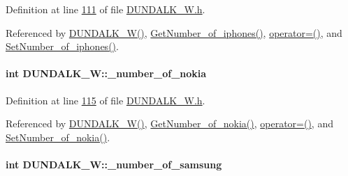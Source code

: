 Definition at line \hyperlink{_d_u_n_d_a_l_k___w_8h_source_l00111}{111} of file \hyperlink{_d_u_n_d_a_l_k___w_8h_source}{D\+U\+N\+D\+A\+L\+K\+\_\+\+W.\+h}.



Referenced by \hyperlink{_d_u_n_d_a_l_k___w_8h_source_l00024}{D\+U\+N\+D\+A\+L\+K\+\_\+\+W()}, \hyperlink{_d_u_n_d_a_l_k___w_8cpp_source_l00113}{Get\+Number\+\_\+of\+\_\+iphones()}, \hyperlink{_d_u_n_d_a_l_k___w_8h_source_l00075}{operator=()}, and \hyperlink{_d_u_n_d_a_l_k___w_8cpp_source_l00109}{Set\+Number\+\_\+of\+\_\+iphones()}.

\paragraph[{\texorpdfstring{\+\_\+number\+\_\+of\+\_\+nokia}{_number_of_nokia}}]{\setlength{\rightskip}{0pt plus 5cm}int D\+U\+N\+D\+A\+L\+K\+\_\+\+W\+::\+\_\+number\+\_\+of\+\_\+nokia\hspace{0.3cm}{\ttfamily [private]}}\hypertarget{class_d_u_n_d_a_l_k___w_a8e794ecf0c55b5606a8f4a0ab214c657_a8e794ecf0c55b5606a8f4a0ab214c657}{}\label{class_d_u_n_d_a_l_k___w_a8e794ecf0c55b5606a8f4a0ab214c657_a8e794ecf0c55b5606a8f4a0ab214c657}


Definition at line \hyperlink{_d_u_n_d_a_l_k___w_8h_source_l00115}{115} of file \hyperlink{_d_u_n_d_a_l_k___w_8h_source}{D\+U\+N\+D\+A\+L\+K\+\_\+\+W.\+h}.



Referenced by \hyperlink{_d_u_n_d_a_l_k___w_8h_source_l00024}{D\+U\+N\+D\+A\+L\+K\+\_\+\+W()}, \hyperlink{_d_u_n_d_a_l_k___w_8cpp_source_l00081}{Get\+Number\+\_\+of\+\_\+nokia()}, \hyperlink{_d_u_n_d_a_l_k___w_8h_source_l00075}{operator=()}, and \hyperlink{_d_u_n_d_a_l_k___w_8cpp_source_l00077}{Set\+Number\+\_\+of\+\_\+nokia()}.

\paragraph[{\texorpdfstring{\+\_\+number\+\_\+of\+\_\+samsung}{_number_of_samsung}}]{\setlength{\rightskip}{0pt plus 5cm}int D\+U\+N\+D\+A\+L\+K\+\_\+\+W\+::\+\_\+number\+\_\+of\+\_\+samsung\hspace{0.3cm}{\ttfamily [private]}}\hypertarget{class_d_u_n_d_a_l_k___w_afec98ddc022c03aaaaa2848e5ca7cfb3_afec98ddc022c03aaaaa2848e5ca7cfb3}{}\label{class_d_u_n_d_a_l_k___w_afec98ddc022c03aaaaa2848e5ca7cfb3_afec98ddc022c03aaaaa2848e5ca7cfb3}


